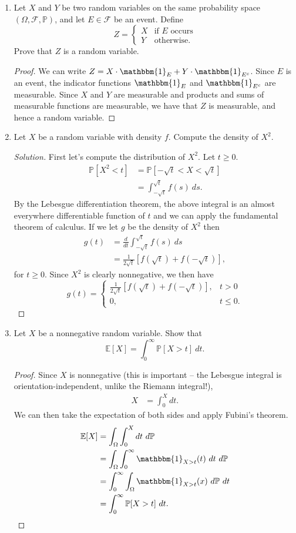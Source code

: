 \documentclass[11pt,letterpaper]{report}
\newcommand{\mcal}[1]{\mathcal{#1}}
\newcommand{\E}{\mathbb{E}}
\newcommand{\Prob}{\mathbb{P}}
\newcommand{\ind}{\mathbbm{1}}
\newenvironment{solution}
{\begin{proof}[Solution]}
{\end{proof}}
\begin{document}
\begin{enumerate}
	\item Let $X$ and $Y$ be two random variables on the same probability space $(\Omega, \mcal{F}, \Prob)$, and let $E\in \mcal{F}$ be an event. Define
	\[
	Z = \begin{cases}
		X&\text{if }E\text{ occurs}\\
		Y&\text{otherwise.}
	\end{cases}
	\]
	Prove that $Z$ is a random variable.
	\begin{proof}
		We can write $Z = X\cdot \ind_E + Y\cdot \ind_{E^c}$. Since $E$ is an event, the indicator functions $\ind_E$ and $\ind_{E^c}$ are measurable. Since $X$ and $Y$ are measurable and products and sums of measurable functions are measurable, we have that $Z$ is measurable, and hence a random variable.
	\end{proof}

	\item Let $X$ be a random variable with density $f$. Compute the density of $X^2$.
	\begin{solution}
		First let's compute the distribution of $X^2$. Let $t\geq 0$.
		\begin{align*}
			\Prob[X^2<t] &= \Prob[-\sqrt{t}<X<\sqrt{t}]\\
			&= \int_{-\sqrt{t}}^{\sqrt{t}}f(s)\ ds.
		\end{align*}
		By the Lebesgue differentiation theorem, the above integral is an almost everywhere differentiable function of $t$ and we can apply the fundamental theorem of calculus. If we let $g$ be the density of $X^2$ then
		\begin{align*}
			g(t) &= \frac{d}{dt}\int_{-\sqrt{t}}^{\sqrt{t}}f(s)\ ds\\
			&= \frac{1}{2\sqrt{t}}[f(\sqrt{t}) + f(-\sqrt{t})],
		\end{align*}
		for $t\geq 0$. Since $X^2$ is clearly nonnegative, we then have
		\[
		g(t) = \begin{cases}
			\frac{1}{2\sqrt{t}}[f(\sqrt{t})+f(-\sqrt{t})],&t>0\\
			0,&t\leq 0.
		\end{cases}
		\]
	\end{solution}

	\item Let $X$ be a nonnegative random variable. Show that
	\[
	\E[X] = \int_0^\infty \Prob[X>t]\ dt.
	\]
	\begin{proof}
		Since $X$ is nonnegative (this is important -- the Lebesgue integral is orientation-independent, unlike the Riemann integral!),
		\begin{align*}
			X &= \int_0^Xdt.
		\end{align*}
		We can then take the expectation of both sides and apply Fubini's theorem.
		\begin{align*}
			\E[X] &= \int_\Omega\int_0^Xdt\ d\Prob\\
			&= \int_\Omega\int_0^\infty \ind_{X>t}(t)\ dt\ d\Prob\\
			&= \int_0^\infty \int_\Omega\ind_{X>t}(x)\ d\Prob\ dt\\
			&= \int_0^\infty \Prob[X>t]\ dt.
		\end{align*}
	\end{proof}


\end{enumerate}
\end{document}
